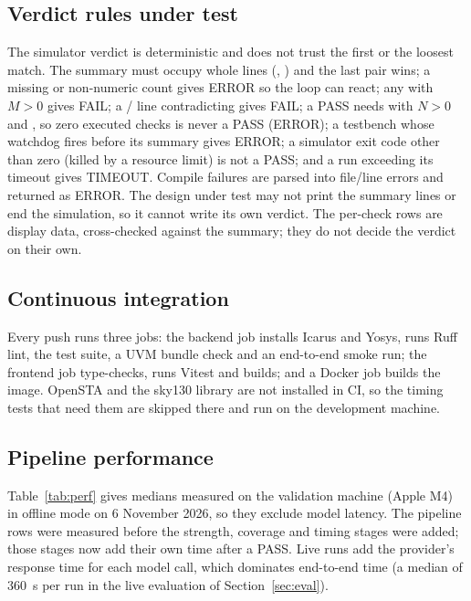\subsection{Verdict rules under test}
The simulator verdict is deterministic and does not trust the first or the loosest match. The summary must occupy whole lines (, ) and the last pair wins; a missing or non-numeric count gives ERROR so the loop can react; any  with $M>0$ gives FAIL; a / line contradicting  gives FAIL; a PASS needs  with $N>0$ and , so zero executed checks is never a PASS (ERROR); a testbench whose watchdog fires before its summary gives ERROR; a simulator exit code other than zero (killed by a resource limit) is not a PASS; and a run exceeding its timeout gives TIMEOUT. Compile failures are parsed into file/line errors and returned as ERROR. The design under test may not print the summary lines or end the simulation, so it cannot write its own verdict. The per-check  rows are display data, cross-checked against the summary; they do not decide the verdict on their own.

\subsection{Continuous integration}
Every push runs three jobs: the backend job installs Icarus and Yosys, runs Ruff lint, the test suite, a UVM bundle check and an end-to-end smoke run; the frontend job type-checks, runs Vitest and builds; and a Docker job builds the image. OpenSTA and the sky130 library are not installed in CI, so the timing tests that need them are skipped there and run on the development machine.

\subsection{Pipeline performance}
\label{sec:perf}
Table~\ref{tab:perf} gives medians measured on the validation machine (Apple M4) in offline mode on 6 November 2026, so they exclude model latency. The pipeline rows were measured before the strength, coverage and timing stages were added; those stages now add their own time after a PASS. Live runs add the provider's response time for each model call, which dominates end-to-end time (a median of 360~s per run in the live evaluation of Section~\ref{sec:eval}).

